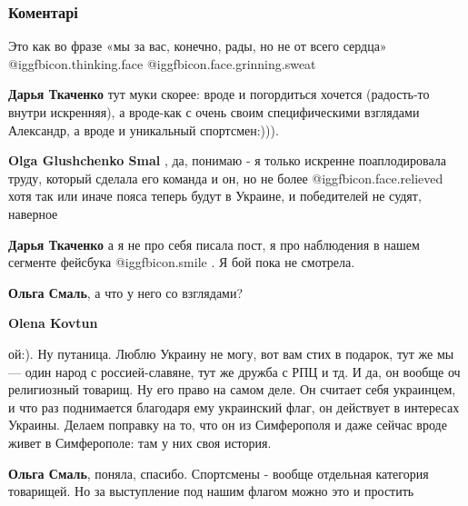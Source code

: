  
 
 
 
 
\subsubsection{Коментарі}
\label{sec:26_09_2021.fb.smal_olga.1.usik_dualnost_pobeda.cmt}

\begin{itemize} %
Это как во фразе «мы за вас, конечно, рады, но не от всего сердца» @igg{fbicon.thinking.face}  @igg{fbicon.face.grinning.sweat} 

\begin{itemize} %
\textbf{Дарья Ткаченко} тут муки скорее: вроде и погордиться хочется (радость-то внутри искренняя), а вроде-как с очень своим специфическими взглядами Александр, а вроде и уникальный спортсмен:))).

\textbf{Olga Glushchenko Smal} , да, понимаю - я только искренне поаплодировала труду, который сделала его команда и он, но не более @igg{fbicon.face.relieved} хотя так или иначе пояса теперь будут в Украине, и победителей не судят, наверное

\textbf{Дарья Ткаченко} а я не про себя писала пост, я про наблюдения в нашем сегменте фейсбука @igg{fbicon.smile} . Я бой пока не смотрела.

\textbf{Ольга Смаль}, а что у него со взглядами?

\textbf{Olena Kovtun} 

ой:). Ну путаница. Люблю Украину не могу, вот вам стих в подарок, тут же мы —
один народ с россией-славяне, тут же дружба с РПЦ и тд. И да, он вообще оч
религиозный товарищ. Ну его право на самом деле. Он считает себя украинцем, и
что раз поднимается благодаря ему украинский флаг, он действует в интересах
Украины. Делаем поправку на то, что он из Симферополя и даже сейчас вроде живет
в Симферополе: там у них своя история.


\textbf{Ольга Смаль}, поняла, спасибо. Спортсмены - вообще отдельная категория товарищей. Но за выступление под нашим флагом можно это и простить


\end{itemize}
\end{itemize}
